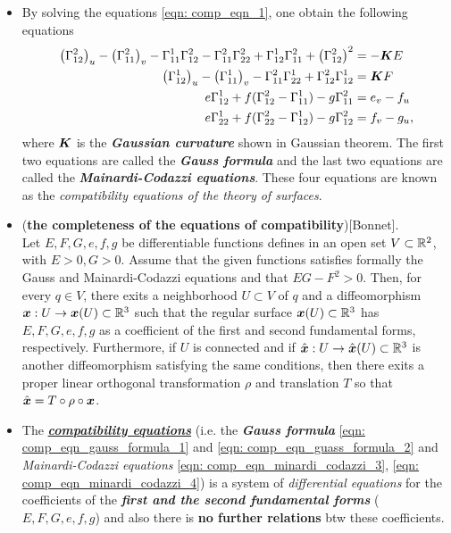 \documentclass[11pt]{article}
\begin{document}
\begin{itemize}
\item By solving the equations \eqref{eqn: comp_eqn_1}, one obtain the following equations
\begin{align}
\left(\Gamma_{12}^{2}\right)_{u}- \left(\Gamma_{11}^{2}\right)_{v} - \Gamma_{11}^{1}\Gamma_{12}^{2} - \Gamma_{11}^{2}\Gamma_{22}^{2} + \Gamma_{12}^{1}\Gamma_{11}^{2} +\left(\Gamma_{12}^{2}\right)^{2}
&= -\boldsymbol{K}E \label{eqn: comp_eqn_gauss_formula_1}\\
\left(\Gamma_{12}^{1}\right)_{u}-\left(\Gamma_{11}^{1}\right)_{v} -   \Gamma_{11}^{2}\Gamma_{22}^{1}  + \Gamma_{12}^{2}\Gamma_{12}^{1}
&= \boldsymbol{K}F \label{eqn: comp_eqn_guass_formula_2}\\
 e\Gamma_{12}^{1} + f(\Gamma_{12}^{2} - \Gamma_{11}^{1}) - g\Gamma_{11}^{2}&= e_{v} - f_{u}  \label{eqn: comp_eqn_minardi_codazzi_3}\\
 e\Gamma_{22}^{1} + f(\Gamma_{22}^{2} - \Gamma_{12}^{1}) - g\Gamma_{12}^{2}&= f_{v} - g_{u},  \label{eqn: comp_eqn_minardi_codazzi_4}
\end{align} 
where $\boldsymbol{K}$ is the \textbf{\emph{Gaussian curvature}} shown in Gaussian theorem. The first two equations are called the \emph{\textbf{Gauss formula}} and the last two equations are called the \emph{\textbf{Mainardi-Codazzi equations}}.  These four equations are known as the \emph{compatibility equations of the theory of surfaces}. 


\item 
\begin{theorem} \label{th: Bonnet_th}
(\textbf{the completeness of the equations of compatibility})[Bonnet].\\
Let $E,F,G, e,f,g$ be differentiable functions defines in an open set $V\subset {\mathbb R}^{2}$, with $E>0, G>0$. Assume that the given functions satisfies formally the Gauss and Mainardi-Codazzi equations and that $EG-F^{2} >0$. Then, for every $q\in V$, there exits a neighborhood $U\subset V$  of $q$ and a diffeomorphism $\boldsymbol{x}: U \rightarrow \boldsymbol{x}(U)\subset {\mathbb R}^{3}$ such that the regular surface $ \boldsymbol{x}(U)\subset {\mathbb R}^{3}$ has $E,F,G,e,f,g$ as a coefficient of the first and second fundamental forms, respectively. Furthermore, if $U$ is connected and if $\hat{\boldsymbol{x}}: U \rightarrow \hat{\boldsymbol{x}}(U)\subset {\mathbb R}^{3}$ is another diffeomorphism satisfying the same conditions, then there exits a proper linear orthogonal transformation $\rho$ and translation $T$ so that $\hat{\boldsymbol{x}} = T \circ \rho \circ \boldsymbol{x}$. 
\end{theorem}


\item The \underline{\emph{\textbf{compatibility equations}}} (i.e. the \emph{\textbf{Gauss formula}} \eqref{eqn: comp_eqn_gauss_formula_1} and \eqref{eqn: comp_eqn_guass_formula_2} and \emph{Mainardi-Codazzi equations} \eqref{eqn: comp_eqn_minardi_codazzi_3}, \eqref{eqn: comp_eqn_minardi_codazzi_4}) is a system of \emph{differential equations} for the coefficients of the \emph{\textbf{first and the second fundamental forms}} ($E,F,G,e,f,g$) and also there is \textbf{no further relations} btw these coefficients.


\end{itemize}
\end{document}
